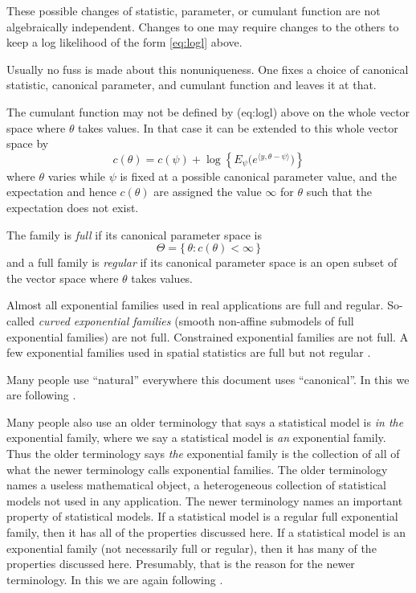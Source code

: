 \documentclass[11pt]{article}
\begin{document}
These possible changes of statistic, parameter, or cumulant function are not
algebraically independent.  Changes to one may require changes to the others
to keep a log likelihood of the form \eqref{eq:logl} above.

Usually no fuss is made about this nonuniqueness.  One fixes a choice
of canonical statistic, canonical parameter, and cumulant function
and leaves it at that.

The cumulant function may not be defined by \@ref(eq:logl) above
on the whole vector space where $\theta$ takes values.  In that case
it can be extended to this whole vector space by
\begin{equation} \label{eq:cumfun}
   c(\theta) = c(\psi) + \log\left\{
   E_\psi\bigl( e^{\langle y, \theta - \psi\rangle} \bigr) \right\}
\end{equation}
where $\theta$ varies while $\psi$ is fixed at
a possible canonical parameter value, and
the expectation and hence $c(\theta)$ are assigned
the value $\infty$ for $\theta$ such that the expectation does not exist.

The family is \emph{full} if its canonical parameter space is
\begin{equation} \label{eq:full}
   \Theta = \{\, \theta : c(\theta) < \infty \,\}
\end{equation}
and a full family is \emph{regular} if its canonical parameter space is an open
subset of the vector space where $\theta$ takes values.

Almost all exponential families used in real applications are full and regular.
So-called \emph{curved exponential families} (smooth non-affine submodels of
full exponential families) are not full.
Constrained exponential families \citep{geyer-constrained} are not full.
A few exponential families used in spatial statistics are full but not regular
\citep{geyer-moller}.

Many people use ``natural'' everywhere this document uses ``canonical''.
In this we are following \citet{barndorff-nielsen}.

Many people also use an older terminology that says a statistical model
is \emph{in the} exponential family, where we say a statistical model
is \emph{an} exponential family.  Thus the older terminology says \emph{the} exponential
family is the collection of all of what the newer terminology calls
exponential families.  The older terminology names a useless
mathematical object, a heterogeneous collection of statistical models not
used in any application.
The newer terminology names an important property of statistical models.
If a statistical model is a regular full exponential family, then it
has all of the properties discussed here.
If a statistical model is an exponential family (not necessarily full or
regular), then it has many of the properties discussed here.
Presumably, that is the reason for the newer terminology.
In this we are again following \citep{barndorff-nielsen}.
\end{document}
